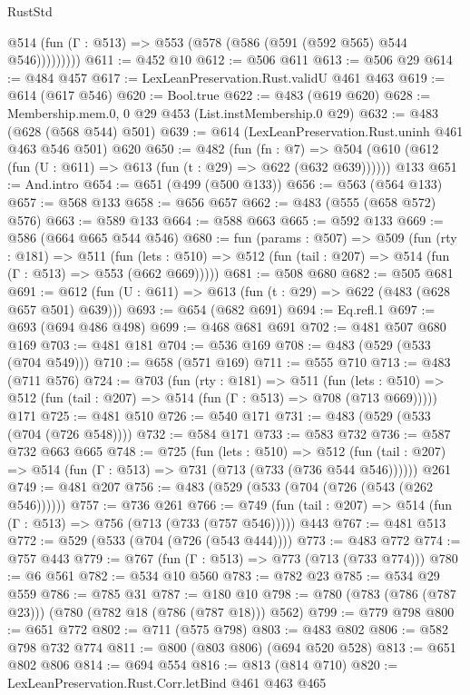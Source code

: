 \begin{lexlean}{RustStd}
\begin{coremodule}
            @514 (fun (Γ : @513) => @553 (@578 (@586 (@591 (@592 @565) @544 @546)))))))))
@611 := @452 @10
@612 := @506 @611
@613 := @506 @29
@614 := @484 @457
@617 := LexLeanPreservation.Rust.validU @461 @463
@619 := @614 (@617 @546)
@620 := Bool.true
@622 := @483 (@619 @620)
@628 := Membership.mem.{0, 0} @29 @453 (List.instMembership.{0} @29)
@632 := @483 (@628 (@568 @544) @501)
@639 := @614 (LexLeanPreservation.Rust.uninh @461 @463 @546 @501) @620
@650 := @482
    (fun (fn : @7) =>
    @504 (@610 (@612 (fun (U : @611) => @613 (fun (t : @29) => @622 (@632 @639))))))
    @133
@651 := And.intro
@654 := @651 (@499 (@500 @133))
@656 := @563 (@564 @133)
@657 := @568 @133
@658 := @656 @657
@662 := @483 (@555 (@658 @572) @576)
@663 := @589 @133
@664 := @588 @663
@665 := @592 @133
@669 := @586 (@664 @665 @544 @546)
@680 := fun (params : @507) =>
  @509
    (fun (rty : @181) =>
    @511
      (fun (lets : @510) => @512 (fun (tail : @207) => @514 (fun (Γ : @513) => @553 (@662 @669)))))
@681 := @508 @680
@682 := @505 @681
@691 := @612 (fun (U : @611) => @613 (fun (t : @29) => @622 (@483 (@628 @657 @501) @639)))
@693 := @654 (@682 @691)
@694 := Eq.refl.{1}
@697 := @693 (@694 @486 @498)
@699 := @468 @681 @691
@702 := @481 @507 @680 @169
@703 := @481 @181
@704 := @536 @169
@708 := @483 (@529 (@533 (@704 @549)))
@710 := @658 (@571 @169)
@711 := @555 @710
@713 := @483 (@711 @576)
@724 := @703
    (fun (rty : @181) =>
    @511
      (fun (lets : @510) => @512 (fun (tail : @207) => @514 (fun (Γ : @513) => @708 (@713 @669)))))
    @171
@725 := @481 @510
@726 := @540 @171
@731 := @483 (@529 (@533 (@704 (@726 @548))))
@732 := @584 @171
@733 := @583 @732
@736 := @587 @732 @663 @665
@748 := @725
    (fun (lets : @510) =>
    @512 (fun (tail : @207) => @514 (fun (Γ : @513) => @731 (@713 (@733 (@736 @544 @546))))))
    @261
@749 := @481 @207
@756 := @483 (@529 (@533 (@704 (@726 (@543 (@262 @546))))))
@757 := @736 @261
@766 := @749 (fun (tail : @207) => @514 (fun (Γ : @513) => @756 (@713 (@733 (@757 @546))))) @443
@767 := @481 @513
@772 := @529 (@533 (@704 (@726 (@543 @444))))
@773 := @483 @772
@774 := @757 @443
@779 := @767 (fun (Γ : @513) => @773 (@713 (@733 @774)))
@780 := @6 @561
@782 := @534 @10 @560
@783 := @782 @23
@785 := @534 @29 @559
@786 := @785 @31
@787 := @180 @10
@798 := @780 (@783 (@786 (@787 @23))) (@780 (@782 @18 (@786 (@787 @18))) @562)
@799 := @779 @798
@800 := @651 @772
@802 := @711 (@575 @798)
@803 := @483 @802
@806 := @582 @798 @732 @774
@811 := @800 (@803 @806) (@694 @520 @528)
@813 := @651 @802 @806
@814 := @694 @554
@816 := @813 (@814 @710)
@820 := LexLeanPreservation.Rust.Corr.letBind @461 @463 @465

\end{coremodule}
\end{lexlean}
